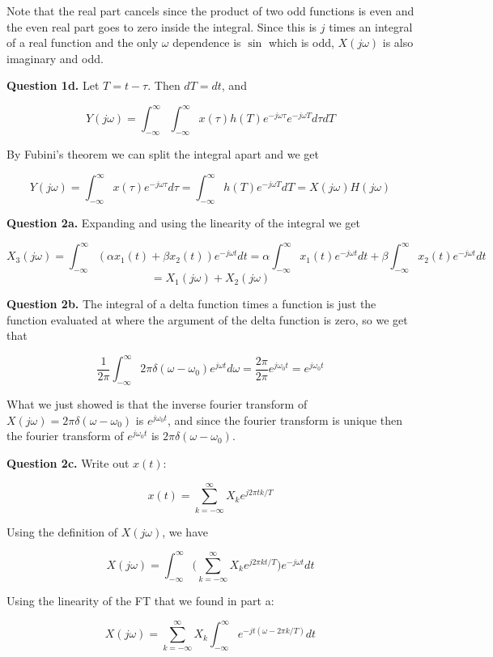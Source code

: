 \documentclass[letterpaper, reqno,11pt]{article}
\begin{document}
Note that the real part cancels since the product of two odd functions is even and the even real part goes to zero inside the integral. Since this is $j$ times an integral of a real function and the only $\omega$ dependence is $\sin$ which is odd, $X(j\omega)$ is also imaginary and odd. 

{\noindent\bf Question 1d.} Let $T=t-\tau$. Then $dT=dt$, and 

\[
    Y(j\omega) = \int_{-\infty}^\infty\int_{-\infty}^\infty x(\tau) h(T)e^{-j\omega \tau}e^{-j\omega T}d\tau dT
\]

By Fubini's theorem we can split the integral apart and we get 

\[
    Y(j\omega) = \int_{-\infty}^\infty x(\tau)e^{-j\omega\tau}d\tau=\int_{-\infty}^\infty h(T)e^{-j\omega T}dT=X(j\omega)H(j\omega)
\]

{\noindent\bf Question 2a.} Expanding and using the linearity of the integral we get 

\[
    X_3(j\omega) = \int_{-\infty}^\infty (\alpha x_1(t)+\beta x_2(t))e^{-j\omega t}dt=\alpha\int_{-\infty}^\infty x_1(t)e^{-j\omega t}dt+\beta\int_{-\infty}^\infty x_2(t)e^{-j\omega t}dt
\]
\[
    =X_1(j\omega)+X_2(j\omega)    
\]

{\noindent\bf Question 2b.} The integral of a delta function times a function is just the function evaluated at where the argument of the delta function is zero, so we get that 

\[
    \frac1{2\pi}\int_{-\infty}^\infty2\pi\delta(\omega-\omega_0)e^{j\omega t}d\omega=\frac{2\pi}{2\pi}e^{j\omega_0t}=e^{j\omega_0 t}    
\]

What we just showed is that the inverse fourier transform of $X(j\omega)=2\pi\delta(\omega-\omega_0)$ is $e^{j\omega_0t}$, and since the fourier transform is unique then the fourier transform of $e^{j\omega_0t}$ is $2\pi\delta(\omega-\omega_0)$. 

{\noindent\bf Question 2c.} Write out $x(t)$: 

\[
    x(t)=\sum_{k=-\infty}^\infty X_k e^{j2\pi tk/T}
\]

Using the definition of $X(j\omega)$, we have 

\[
    X(j\omega) = \int_{-\infty}^\infty \bigg(\sum_{k=-\infty}^\infty X_ke^{j2\pi kt/T}\bigg)e^{-j\omega t}dt
\]

Using the linearity of the FT that we found in part a: 

\[
    X(j\omega)=\sum_{k=-\infty}^{\infty} X_k \int_{-\infty}^\infty e^{-jt(\omega-2\pi k/T)}dt
\]
\end{document}
